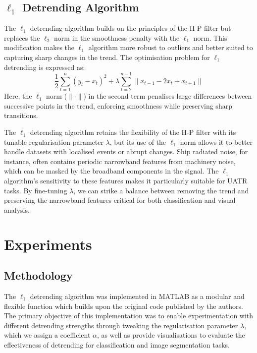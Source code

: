 \subsection{\texorpdfstring{$\ell_1$}{l1} Detrending Algorithm}
The $\ell_1$ detrending algorithm \cite{kim_ell_1_2009} builds on the principles of the H-P filter but replaces the $\ell_2$ norm in the smoothness penalty with the $\ell_1$ norm. This modification makes the $\ell_1$ algorithm more robust to outliers and better suited to capturing sharp changes in the trend. The optimisation problem for $\ell_1$ detrending is expressed as:
\begin{equation}
    \frac{1}{2} \sum_{t=1}^n (y_t - x_t)^2 + \lambda \sum_{t=2}^{n-1} \| x_{t-1} - 2x_t + x_{t+1} \|
\end{equation}
Here, the $\ell_1$ norm ($\| \cdot \|$) in the second term penalises large differences between successive points in the trend, enforcing smoothness while preserving sharp transitions.

The $\ell_1$ detrending algorithm retains the flexibility of the H-P filter with its tunable regularisation parameter $\lambda$, but its use of the $\ell_1$ norm allows it to better handle datasets with localised events or abrupt changes. Ship radiated noise, for instance, often contains periodic narrowband features from machinery noise, which can be masked by the broadband components in the signal. The $\ell_1$ algorithm’s sensitivity to these features makes it particularly suitable for UATR tasks. By fine-tuning $\lambda$, we can strike a balance between removing the trend and preserving the narrowband features critical for both classification and visual analysis.

\section{Experiments}

\subsection{Methodology}

The $\ell_1$ detrending algorithm was implemented in MATLAB as a modular and flexible function which builds upon the original code published by the authors. The primary objective of this implementation was to enable experimentation with different detrending strengths through tweaking the regularisation parameter $\lambda$, which we assign a coefficient $\alpha$, as well as provide visualisations to evaluate the effectiveness of detrending for classification and image segmentation tasks.

